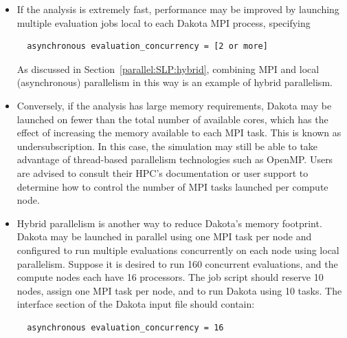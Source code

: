 \begin{itemize}


\item If the analysis is extremely fast, performance may be
improved by launching multiple evaluation jobs local to each Dakota
MPI process, specifying
\begin{verbatim}
  asynchronous evaluation_concurrency = [2 or more]
\end{verbatim}
As discussed in Section~\ref{parallel:SLP:hybrid}, combining MPI and 
local (asynchronous) parallelism in this way is an example of hybrid
parallelism.

\item Conversely, if the analysis has large memory requirements, 
Dakota may be launched on fewer than the total number of available cores, 
which has the effect of increasing the memory available to each MPI task. 
This is known as undersubscription. In this case, the simulation may still 
be able to take advantage of thread-based parallelism technologies such as OpenMP.
Users are advised to consult their HPC's documentation or user support to
determine how to control the number of MPI tasks launched per compute node.

\item Hybrid parallelism is another way to reduce Dakota's memory footprint.
Dakota may be launched in parallel using one MPI task per node and configured
to run multiple evaluations concurrently on each node using local parallelism.
Suppose it is desired to run 160 concurrent evaluations, and the compute nodes
each have 16 processors. The job script should reserve 10 nodes,
assign one MPI task per node, and to run Dakota using 10 tasks. The interface 
section of the Dakota input file should contain:
\begin{verbatim}
  asynchronous evaluation_concurrency = 16
\end{verbatim}

\end{itemize}

